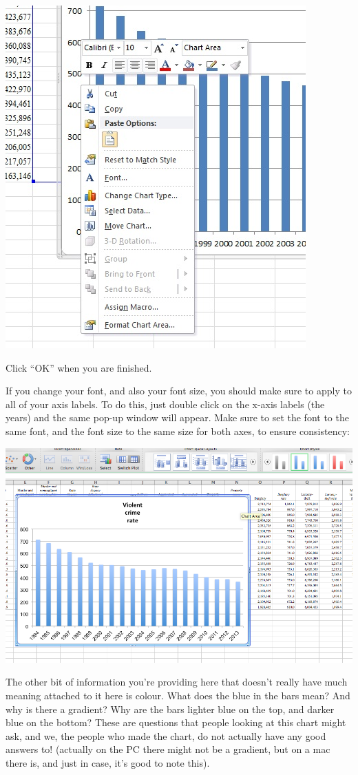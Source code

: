 \documentclass[
]{book}
\begin{document}
\includegraphics{imgs/pc_change_font.jpg}

Click ``OK'' when you are finished.

If you change your font, and also your font size, you should make sure to apply to all of your axis labels. To do this, just double click on the x-axis labels (the years) and the same pop-up window will appear. Make sure to set the font to the same font, and the font size to the same size for both axes, to ensure consistency:

\includegraphics{imgs/desc_viz_10.png}

The other bit of information you're providing here that doesn't really have much meaning attached to it here is colour. What does the blue in the bars mean? And why is there a gradient? Why are the bars lighter blue on the top, and darker blue on the bottom? These are questions that people looking at this chart might ask, and we, the people who made the chart, do not actually have any good answers to!
(actually on the PC there might not be a gradient, but on a mac there is, and just in case, it's good to note this).
\end{document}
